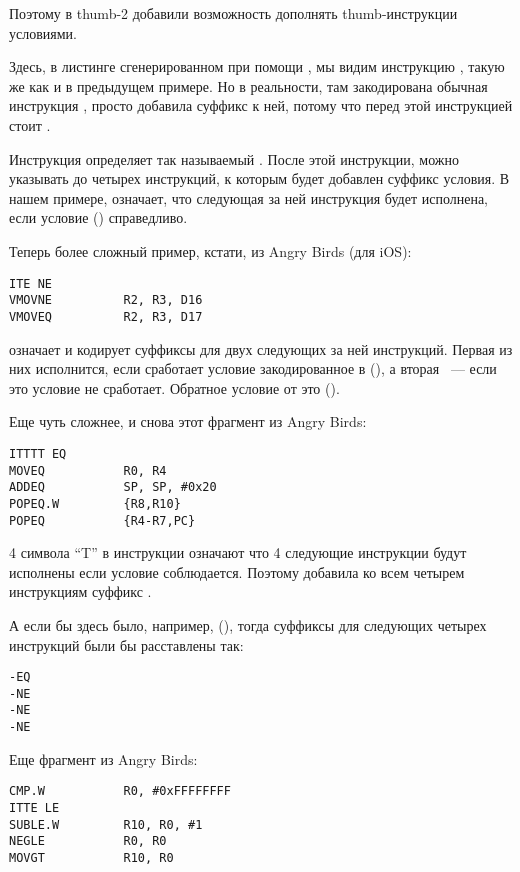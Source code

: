 Поэтому в thumb-2 добавили возможность дополнять thumb-инструкции условиями.

Здесь, в листинге сгенерированном при помощи \IDA, мы видим инструкцию , 
такую же как и в предыдущем
примере. Но в реальности, там закодирована обычная инструкция , просто \IDA добавила 
суффикс  к ней,
потому что перед этой инструкцией стоит .

Инструкция  определяет так называемый . После этой инструкции, можно указывать 
до четырех инструкций, к которым будет добавлен суффикс условия. В нашем примере,  означает,
что следующая за ней инструкция будет исполнена, если условие  () справедливо.

Теперь более сложный пример, кстати, из Angry Birds (для iOS):

\begin{lstlisting}
ITE NE
VMOVNE          R2, R3, D16
VMOVEQ          R2, R3, D17
\end{lstlisting}

 означает  и кодирует суффиксы для двух следующих за ней инструкций. Первая из них
исполнится, если сработает условие закодированное в  (), а вторая ~--- 
если это условие не сработает. 
Обратное условие от  это  ().

Еще чуть сложнее, и снова этот фрагмент из Angry Birds:

\begin{lstlisting}
ITTTT EQ
MOVEQ           R0, R4
ADDEQ           SP, SP, #0x20
POPEQ.W         {R8,R10}
POPEQ           {R4-R7,PC}
\end{lstlisting}

4 символа ``T'' в инструкции означают что 4 следующие инструкции будут исполнены если условие соблюдается. 
Поэтому
\IDA добавила ко всем четырем инструкциям суффикс . 

А если бы здесь было, например,  (), 
тогда суффиксы для следующих четырех инструкций были бы расставлены так:

\begin{lstlisting}
-EQ
-NE
-NE
-NE
\end{lstlisting}

Еще фрагмент из Angry Birds:

\begin{lstlisting}
CMP.W           R0, #0xFFFFFFFF
ITTE LE
SUBLE.W         R10, R0, #1
NEGLE           R0, R0
MOVGT           R10, R0
\end{lstlisting}

